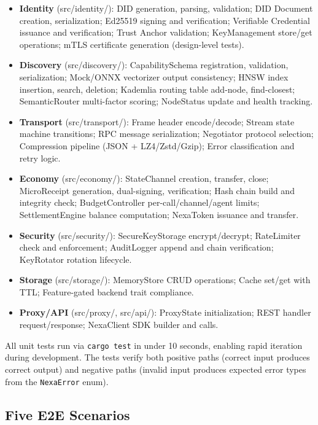 \begin{itemize}
  \item \textbf{Identity} (src/identity/): DID generation, parsing, validation; DID Document creation, serialization; Ed25519 signing and verification; Verifiable Credential issuance and verification; Trust Anchor validation; KeyManagement store/get operations; mTLS certificate generation (design-level tests).
  \item \textbf{Discovery} (src/discovery/): CapabilitySchema registration, validation, serialization; Mock/ONNX vectorizer output consistency; HNSW index insertion, search, deletion; Kademlia routing table add-node, find-closest; SemanticRouter multi-factor scoring; NodeStatus update and health tracking.
  \item \textbf{Transport} (src/transport/): Frame header encode/decode; Stream state machine transitions; RPC message serialization; Negotiator protocol selection; Compression pipeline (JSON + LZ4/Zstd/Gzip); Error classification and retry logic.
  \item \textbf{Economy} (src/economy/): StateChannel creation, transfer, close; MicroReceipt generation, dual-signing, verification; Hash chain build and integrity check; BudgetController per-call/channel/agent limits; SettlementEngine balance computation; NexaToken issuance and transfer.
  \item \textbf{Security} (src/security/): SecureKeyStorage encrypt/decrypt; RateLimiter check and enforcement; AuditLogger append and chain verification; KeyRotator rotation lifecycle.
  \item \textbf{Storage} (src/storage/): MemoryStore CRUD operations; Cache set/get with TTL; Feature-gated backend trait compliance.
  \item \textbf{Proxy/API} (src/proxy/, src/api/): ProxyState initialization; REST handler request/response; NexaClient SDK builder and calls.
\end{itemize}

All unit tests run via \texttt{cargo test} in under 10 seconds, enabling rapid iteration during development. The tests verify both positive paths (correct input produces correct output) and negative paths (invalid input produces expected error types from the \texttt{NexaError} enum).

\subsection{Five E2E Scenarios}

